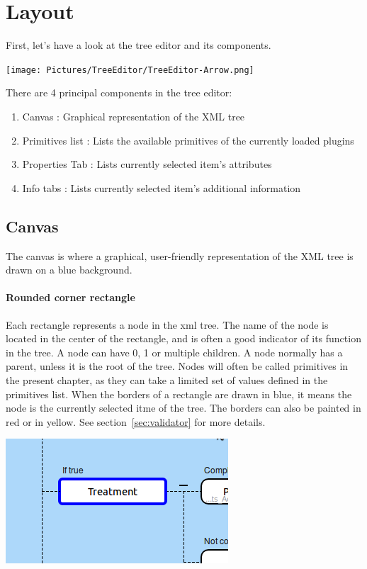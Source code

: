 \documentclass[a4paper,11pt]{report}
\begin{document}
\section{Layout}
First, let's have a look at the tree editor and its components.
\begin{center}
\texttt{[image: Pictures/TreeEditor/TreeEditor-Arrow.png]}
\label{fig:treeEditor}
\end{center}

There are 4 principal components in the tree editor:
\begin{enumerate}
\item{Canvas} : Graphical representation of the XML tree
\item{Primitives list} : Lists the available primitives of the currently loaded plugins  
\item{Properties Tab} :  Lists currently selected item's attributes
\item{Info tabs} : Lists currently selected item's additional information
\end{enumerate}

\subsection{Canvas}
The canvas is where a graphical, user-friendly representation of the XML tree is drawn on a blue background.

\paragraph{Rounded corner rectangle}
Each rectangle represents a node in the xml tree. The name of the node is located in the center of the rectangle, and is often a good indicator of its function in the tree. A node can have 0, 1 or multiple children. A node normally has a parent, unless it is the root of the tree. Nodes will often be called primitives in the present chapter, as they can take a limited set of values defined in the primitives list. When the borders of a rectangle are drawn in blue, it means the node is the currently selected itme of the tree. The borders can also be painted in red or in yellow. See section~\ref{sec:validator} for more details.

\begin{center}
\includegraphics[scale=0.4]{Pictures/TreeEditor/nodeSelected.png}
\end{center}
\end{document}
